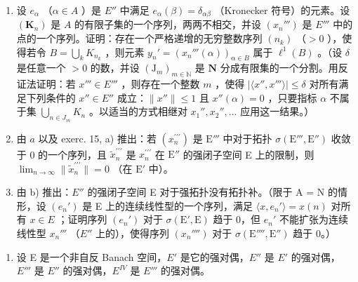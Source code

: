 \begin{enumerate}
\def\labelenumi{\alph{enumi})}
\item
  设 \(e_{\alpha}\) （\(\alpha \in A\) ）是 \(E''\) 中满足 \(e_{\alpha}(\beta) = \delta_{\alpha \beta}\) （Kronecker 符号）的元素。设 \((\mathbf{K}_n)\) 是 \(A\) 的有限子集的一个序列，两两不相交，并设 \((x_n''')\) 是 \(E'''\) 中的点的一个序列。证明：存在一个严格递增的无穷整数序列 \((n_k)\) （\(>0\) ），使得若令 \(B = \bigcup_k K_{n_k}\) ，则元素 \(y_n' = (x_n'''(\alpha))_{\alpha \in B}\) 属于 \(\ell^1(B)\) 。（设 \(\delta\) 是任意一个 \(>0\) 的数，并设 \((\mathrm{J}_m)_{m \in \mathbb{N}}\) 是 \(\mathbf{N}\) 分成有限集的一个分割。用反证法证明：若 \(x''' \in E'''\) ，则存在一个整数 \(m\) ，使得 \(|\langle x'', x''' \rangle| \leqslant \delta\) 对所有满足下列条件的 \(x'' \in E''\) 成立：\(\| x'' \| \leqslant 1\) 且 \(x''(\alpha) = 0\) ，只要指标 \(\alpha\) 不属于集 \(\bigcup_{n \in J_m} K_n\) 。以适当的方式相继对 \(x_1'', x_2'', ...\) 应用这一结果。）
\item
  由 \(a\) 以及 exerc. 15, a) 推出：若 \((x_{n}^{\prime \prime \prime})\) 是 \(\mathrm{E}'''\) 中对于拓扑 \(\sigma (\mathrm{E}''',\mathrm{E}'')\) 收敛于 0 的一个序列，且 \(\tilde{x}_n^{\prime \prime \prime}\) 是 \(x_{n}^{\prime \prime \prime}\) 在 \(\mathrm{E}''\) 的强闭子空间 E 上的限制，则 \(\lim_{n\to \infty}\| \tilde{x}_n^{\prime \prime \prime}\| = 0\) （在 \(\mathrm{E}'\) 中）。
\item
  由 b) 推出：\(E''\) 的强闭子空间 E 对于强拓扑没有拓扑补。（限于 A = N 的情形，设 \((e_{n}')\) 是 E 上的连续线性型的一个序列，满足 \(\langle x, e_{n}' \rangle = x(n)\) 对所有 \(x \in E\) ；证明序列 \((e_{n}')\) 对于 \(\sigma(\mathrm{E}', \mathrm{E})\) 趋于 0，但 \(e_{n}'\) 不能扩张为连续线性型 \(x_{n}'''\) （\(E''\) 上的），使得序列 \((x_{n}'''')\) 对于 \(\sigma(\mathrm{E}'''', \mathrm{E}'')\) 趋于 0。）
\end{enumerate}

\begin{enumerate}
\def\labelenumi{\arabic{enumi})}
\setcounter{enumi}{16}
\tightlist
\item
  设 E 是一个非自反 Banach 空间，\(E'\) 是它的强对偶，\(E''\) 是 \(E'\) 的强对偶，\(E'''\) 是 \(E''\) 的强对偶，\(E^{IV}\) 是 \(E'''\) 的强对偶。
\end{enumerate}

